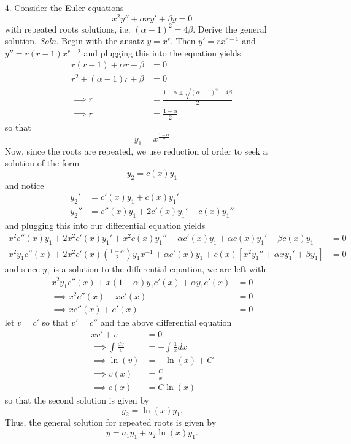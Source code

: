 \documentclass{article}
\begin{document}
\begin{itemize}
    
    \pagebreak
    \item[4.] Consider the Euler equations
    \[x^2y'' + \alpha xy' + \beta y = 0\]
    with repeated roots solutions, i.e. $(\alpha - 1)^2 = 4\beta$. Derive the general solution.
    \newline\newline
    \textit{Soln.} Begin with the ansatz $y = x^r$. Then $y' = rx^{r - 1}$ and $y'' = r(r - 1)x^{r - 2}$ and plugging this into the equation yields
    \begin{align*}
        r(r - 1) + \alpha r + \beta &= 0\\
        r^2 + (\alpha - 1)r + \beta &= 0\\
        \implies r &= \frac{1 - \alpha\pm \sqrt{(\alpha - 1)^2 - 4\beta}}{2}\\
        \implies r &= \frac{1 - \alpha}{2}
    \end{align*}
    so that 
    \[y_1 = x^{\frac{1 - \alpha}{2}}\]
    Now, since the roots are repeated, we use reduction of order to seek a solution of the form
    \[y_2 = c(x)y_1\]
    and notice
    \begin{align*}
        y_2' &= c'(x)y_1 + c(x)y_1'\\
        y_2'' &= c''(x)y_1 + 2c'(x)y_1' + c(x)y_1''
    \end{align*}
    and plugging this into our differential equation yields
    \begin{align*}
        x^2c''(x)y_1 + 2x^2c'(x)y_1' + x^2c(x)y_1'' + \alpha c'(x)y_1 + \alpha c(x)y_1' + \beta c(x)y_1 &= 0\\
        x^2y_1c''(x) + 2x^2c'(x) (\tfrac{1 - \alpha}{2})y_1x^{-1} + \alpha c'(x)y_1 + c(x)[x^2y_1'' + \alpha xy_1' + \beta y_1] &= 0
    \end{align*}
    and since $y_1$ is a solution to the differential equation, we are left with
    \begin{align*}
        x^2y_1c''(x) + x(1 - \alpha)y_1c'(x) + \alpha y_1 c'(x) &= 0\\
        \implies x^2c''(x) + xc'(x) &= 0\\
        \implies xc''(x) + c'(x) &= 0
    \end{align*}
    let $v = c'$ so that $v' = c''$ and the above differential equation
    \begin{align*}
        xv' + v &= 0\\
        \implies \int \frac{dv}{v} &= -\int \frac{1}{x}dx\\
        \implies \ln(v) &= -\ln(x) + C\\
        \implies v(x) &= \frac{C}{x}\\
        \implies c(x) &= C\ln(x)
    \end{align*}
    so that the second solution is given by
    \[y_2 = \ln(x)y_1.\]
    Thus, the general solution for repeated roots is given by
    \[y = a_1y_1 + a_2\ln(x)y_1.\]
    

\end{itemize}
\end{document}
